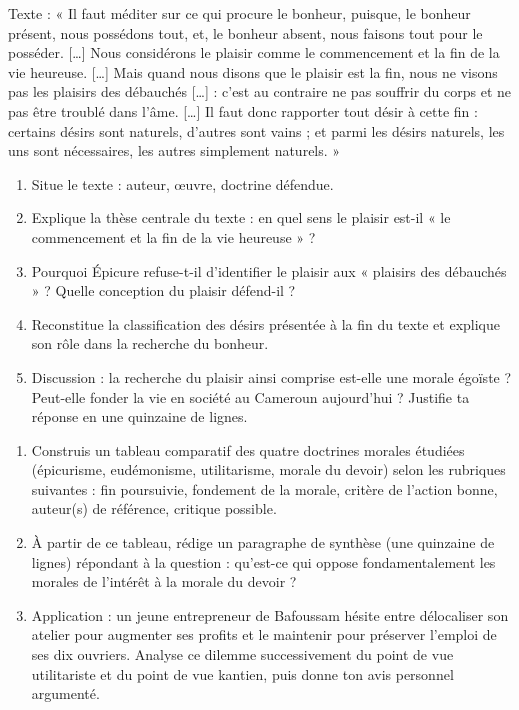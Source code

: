 \documentclass[11pt]{article}
\begin{document}
\begin{exercice}
Texte : « Il faut méditer sur ce qui procure le bonheur, puisque, le bonheur présent, nous possédons tout, et, le bonheur absent, nous faisons tout pour le posséder. [\dots] Nous considérons le plaisir comme le commencement et la fin de la vie heureuse. [\dots] Mais quand nous disons que le plaisir est la fin, nous ne visons pas les plaisirs des débauchés [\dots] : c'est au contraire ne pas souffrir du corps et ne pas être troublé dans l'âme. [\dots] Il faut donc rapporter tout désir à cette fin : certains désirs sont naturels, d'autres sont vains ; et parmi les désirs naturels, les uns sont nécessaires, les autres simplement naturels. »
\begin{enumerate}
\item Situe le texte : auteur, œuvre, doctrine défendue.
\item Explique la thèse centrale du texte : en quel sens le plaisir est-il « le commencement et la fin de la vie heureuse » ?
\item Pourquoi Épicure refuse-t-il d'identifier le plaisir aux « plaisirs des débauchés » ? Quelle conception du plaisir défend-il ?
\item Reconstitue la classification des désirs présentée à la fin du texte et explique son rôle dans la recherche du bonheur.
\item Discussion : la recherche du plaisir ainsi comprise est-elle une morale égoïste ? Peut-elle fonder la vie en société au Cameroun aujourd'hui ? Justifie ta réponse en une quinzaine de lignes.
\end{enumerate}
\end{exercice}

\begin{exercice}
\begin{enumerate}
\item Construis un tableau comparatif des quatre doctrines morales étudiées (épicurisme, eudémonisme, utilitarisme, morale du devoir) selon les rubriques suivantes : fin poursuivie, fondement de la morale, critère de l'action bonne, auteur(s) de référence, critique possible.
\item À partir de ce tableau, rédige un paragraphe de synthèse (une quinzaine de lignes) répondant à la question : qu'est-ce qui oppose fondamentalement les morales de l'intérêt à la morale du devoir ?
\item Application : un jeune entrepreneur de Bafoussam hésite entre délocaliser son atelier pour augmenter ses profits et le maintenir pour préserver l'emploi de ses dix ouvriers. Analyse ce dilemme successivement du point de vue utilitariste et du point de vue kantien, puis donne ton avis personnel argumenté.
\end{enumerate}
\end{exercice}
\end{document}
